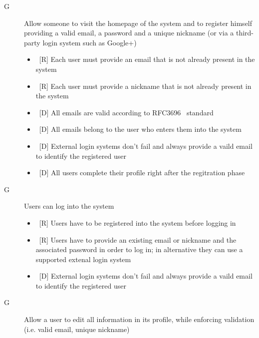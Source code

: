 \setcounter{count}{1}

\begin{description}
\item[G\thecount] Allow someone to visit the homepage of the system and to register himself providing a valid email, a password and a unique nickname (or via a third-party login system such as Google+)

\begin{itemize}
\item~[R] Each user must provide an email that is not already present in the system
\item~[R] Each user must provide a nickname that is not already present in the system
\end{itemize}

\begin{itemize}
\item~[D] All emails are valid according to RFC3696~\cite{RFC3696} standard
\item~[D] All emails belong to the user who enters them into the system
\item~[D] External login systems don’t fail and always provide a vaild email to identify the registered user
\item~[D] All users complete their profile right after the regitration phase
\end{itemize}

\item[G\thecount] Users can log into the system

\begin{itemize}
\item~[R] Users have to be registered into the system before logging in
\item~[R] Users have to provide an existing email or nickname and the associated password in order to log in; in alternative they can use a supported extenal login system
\end{itemize}

\begin{itemize}
\item~[D] External login systems don’t fail and always provide a vaild email to identify the registered user
\end{itemize}

\item[G\thecount] Allow a user to edit all information in its profile, while enforcing validation (i.e. valid email, unique nickname)


\end{description}
